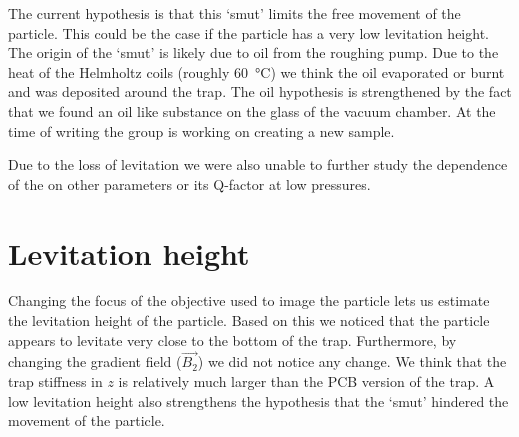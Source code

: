 The current hypothesis is that this `smut' limits the free movement of the particle. This could be the case if the particle has a very low levitation height. The origin of the `smut' is likely due to oil from the roughing pump. Due to the heat of the Helmholtz coils (roughly \qty{60}{\celsius}) we think the oil evaporated or burnt and was deposited around the trap. The oil hypothesis is strengthened by the fact that we found an oil like substance on the glass of the vacuum chamber. At the time of writing the group is working on creating a new sample.

Due to the loss of levitation we were also unable to further study the dependence of the \zmode on other parameters or its Q-factor at low pressures.

\section*{Levitation height}
Changing the focus of the objective used to image the particle lets us estimate the levitation height of the particle. Based on this we noticed that the particle appears to levitate very close to the bottom of the trap. Furthermore, by changing the gradient field ($\vec{B_2}$) we did not notice any change. We think that the trap stiffness in $z$ is relatively much larger than the PCB version of the trap. A low levitation height also strengthens the hypothesis that the `smut' hindered the movement of the particle.

